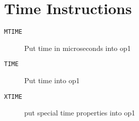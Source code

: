 \section{Time Instructions}
\begin{description}
\item[\texttt{MTIME      }]  Put time in microseconds into op1\\
\end{description}

\begin{description}
\item[\texttt{TIME       }]  Put time into op1\\
\end{description}

\begin{description}
\item[\texttt{XTIME      }]  put special time properties into op1\\
\end{description}

